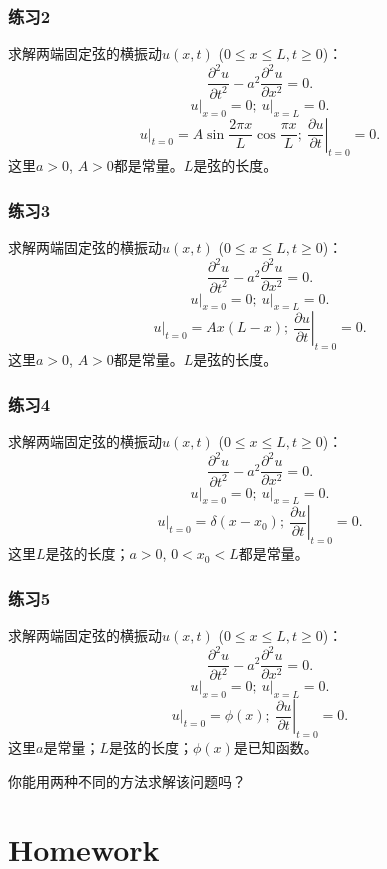 \documentclass[CJK]{beamer}
\begin{document}
\begin{frame}
  \frametitle{练习2}
  求解两端固定弦的横振动$u(x, t)$ ($0\le x\le L, t\ge 0$)：
  $$\frac{\partial^2u}{\partial t^2} - a^2\frac{\partial^2u}{\partial x^2} = 0 .$$
  $$ \left.u\right\vert_{x=0} = 0;\ \left.u\right\vert_{x=L} = 0.$$
  $$ \left.u\right\vert_{t=0} = A\sin\frac{2\pi x}{L}\cos\frac{\pi x}{L};\ \left.\frac{\partial u}{\partial t}\right\vert_{t=0} = 0.$$
  这里$a>0$, $A>0$都是常量。$L$是弦的长度。
\end{frame}


\begin{frame}
  \frametitle{练习3}
  求解两端固定弦的横振动$u(x, t)$ ($0\le x\le L, t\ge 0$)：
  $$\frac{\partial^2u}{\partial t^2} - a^2\frac{\partial^2u}{\partial x^2} = 0 .$$
  $$ \left.u\right\vert_{x=0} = 0;\ \left.u\right\vert_{x=L} = 0.$$
  $$ \left.u\right\vert_{t=0} = Ax(L-x);\ \left.\frac{\partial u}{\partial t}\right\vert_{t=0} = 0.$$
  这里$a>0$, $A>0$都是常量。$L$是弦的长度。
\end{frame}

\begin{frame}
  \frametitle{练习4}
  求解两端固定弦的横振动$u(x, t)$ ($0\le x\le L, t\ge 0$)：
  $$\frac{\partial^2u}{\partial t^2} - a^2\frac{\partial^2u}{\partial x^2} = 0 .$$
  $$ \left.u\right\vert_{x=0} = 0;\ \left.u\right\vert_{x=L} = 0.$$
  $$ \left.u\right\vert_{t=0} = \delta(x-x_0);\ \left.\frac{\partial u}{\partial t}\right\vert_{t=0} = 0.$$
  这里$L$是弦的长度；$a>0$, $0<x_0<L$都是常量。
\end{frame}


\begin{frame}
  \frametitle{练习5}
  求解两端固定弦的横振动$u(x, t)$ ($0\le x\le L, t\ge 0$)：
  $$\frac{\partial^2u}{\partial t^2} - a^2\frac{\partial^2u}{\partial x^2} = 0 .$$
  $$ \left.u\right\vert_{x=0} = 0;\ \left.u\right\vert_{x=L} = 0.$$
  $$ \left.u\right\vert_{t=0} = \phi(x);\ \left.\frac{\partial u}{\partial t}\right\vert_{t=0} = 0.$$
  这里$a$是常量；$L$是弦的长度；$\phi(x)$是已知函数。

  \skipline
  你能用两种不同的方法求解该问题吗？
\end{frame}


\section{Homework}
\end{document}
